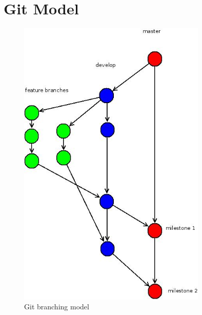 \section{Git Model}
\label{apx:git}

\begin{figure}[h!]
  \caption{Git branching model}
  \centering
    \includegraphics[width=0.8\textwidth]{gitbranch.jpg}
\end{figure}
